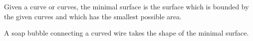 Given a curve or curves, the minimal surface is the surface which is
bounded by the given curves and which has the smallest possible area.
\par
A soap bubble connecting a curved wire takes the shape of the
minimal surface.
